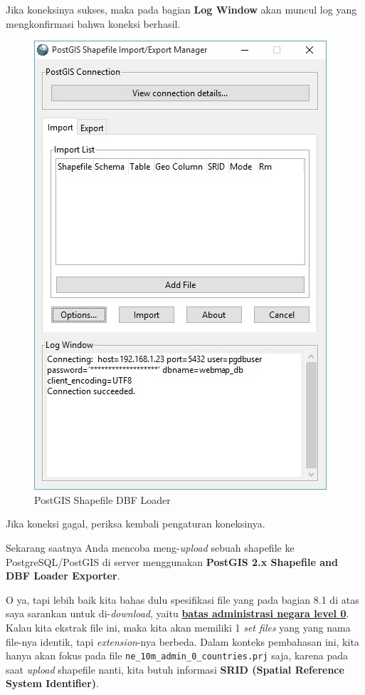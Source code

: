 \documentclass[]{book}
\begin{document}
\begin{itemize}
  Jika koneksinya sukses, maka pada bagian \textbf{Log Window} akan muncul log yang mengkonfirmasi bahwa koneksi berhasil.

  \begin{figure}
  \centering
  \includegraphics{./img/postgis-loader-connection-success.jpg}
  \caption{PostGIS Shapefile DBF Loader}
  \end{figure}

  Jika koneksi gagal, periksa kembali pengaturan koneksinya.

  Sekarang saatnya Anda mencoba meng-\emph{upload} sebuah shapefile ke PostgreSQL/PostGIS di server menggunakan \textbf{PostGIS 2.x Shapefile and DBF Loader Exporter}.

  O ya, tapi lebih baik kita bahas dulu spesifikasi file yang pada bagian 8.1 di atas saya sarankan untuk di-\emph{download}, yaitu \href{https://www.naturalearthdata.com/http//www.naturalearthdata.com/download/10m/cultural/ne_10m_admin_0_countries.zip}{\textbf{batas administrasi negara level 0}}. Kalau kita ekstrak file ini, maka kita akan memiliki 1 \emph{set files} yang yang nama file-nya identik, tapi \emph{extension}-nya berbeda. Dalam konteks pembahasan ini, kita hanya akan fokus pada file \texttt{ne\_10m\_admin\_0\_countries.prj} saja, karena pada saat \emph{upload} shapefile nanti, kita butuh informasi \textbf{SRID (Spatial Reference System Identifier)}.


\end{itemize}
\end{document}
